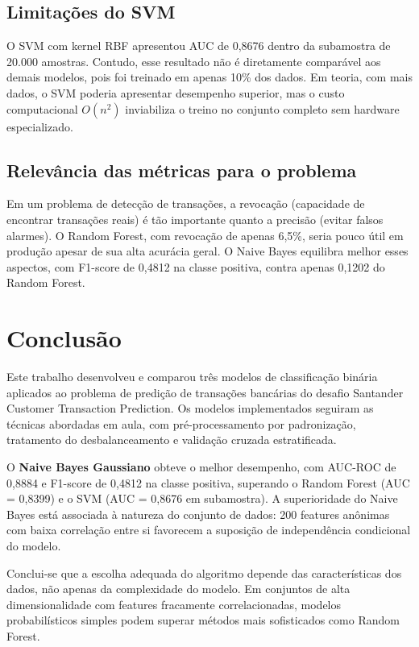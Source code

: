 \documentclass[a4paper,12pt]{article}
\begin{document}
\subsection{Limitações do SVM}

O SVM com kernel RBF apresentou AUC de 0,8676 dentro da subamostra de 20.000 amostras. Contudo, esse resultado não é diretamente comparável aos demais modelos, pois foi treinado em apenas 10\% dos dados. Em teoria, com mais dados, o SVM poderia apresentar desempenho superior, mas o custo computacional $O(n^2)$ inviabiliza o treino no conjunto completo sem hardware especializado.

\subsection{Relevância das métricas para o problema}

Em um problema de detecção de transações, a revocação (capacidade de encontrar transações reais) é tão importante quanto a precisão (evitar falsos alarmes). O Random Forest, com revocação de apenas 6,5\%, seria pouco útil em produção apesar de sua alta acurácia geral. O Naive Bayes equilibra melhor esses aspectos, com F1-score de 0,4812 na classe positiva, contra apenas 0,1202 do Random Forest.

\newpage

\section{Conclusão}

Este trabalho desenvolveu e comparou três modelos de classificação binária aplicados ao problema de predição de transações bancárias do desafio Santander Customer Transaction Prediction. Os modelos implementados seguiram as técnicas abordadas em aula, com pré-processamento por padronização, tratamento do desbalanceamento e validação cruzada estratificada.

O \textbf{Naive Bayes Gaussiano} obteve o melhor desempenho, com AUC-ROC de 0,8884 e F1-score de 0,4812 na classe positiva, superando o Random Forest (AUC = 0,8399) e o SVM (AUC = 0,8676 em subamostra). A superioridade do Naive Bayes está associada à natureza do conjunto de dados: 200 features anônimas com baixa correlação entre si favorecem a suposição de independência condicional do modelo.

Conclui-se que a escolha adequada do algoritmo depende das características dos dados, não apenas da complexidade do modelo. Em conjuntos de alta dimensionalidade com features fracamente correlacionadas, modelos probabilísticos simples podem superar métodos mais sofisticados como Random Forest.
\end{document}
